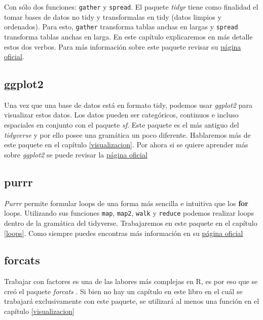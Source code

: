 \documentclass[]{book}
\begin{document}
Con sólo dos funciones: \texttt{gather} y \texttt{spread}. El paquete
\emph{tidyr} \citep{Wickhamtidy} tiene como finalidad el tomar bases de
datos no tidy y transformalas en tidy (datos limpios y ordenados). Para
esto, \texttt{gather} transforma tablas anchas en largas y
\texttt{spread} transforma tablas anchas en larga. En este capítulo
explicaremos en más detalle estos dos verbos. Para más información sobre
este paquete revisar su \href{https://tidyr.tidyverse.org/}{página
oficial}.

\hypertarget{ggplot2}{%
\subsection{ggplot2}\label{ggplot2}}

Una vez que una base de datos está en formato tidy, podemos usar
\emph{ggplot2} \citep{Wickhamggplot} para visualizar estos datos. Los
datos pueden ser categóricos, continuos e incluso espaciales en conjunto
con el paquete \emph{sf}. Este paquete es el más antiguo del
\emph{tidyverse} y por ello posee una gramática un poco diferente.
Hablaremos más de este paquete en el capítulo \ref{visualizacion}. Por
ahora si se quiere aprender más sobre \emph{ggplot2} se puede revisar la
\href{https://ggplot2.tidyverse.org/}{página oficial}

\hypertarget{purrr}{%
\subsection{purrr}\label{purrr}}

\emph{Purrr} \citep{HenryPurrr} permite formular loops de una forma más
sencilla e intuitiva que los \textbf{for} loops. Utilizando sus
funciones \texttt{map}, \texttt{map2}, \texttt{walk} y \texttt{reduce}
podemos realizar loops dentro de la gramática del tidyverse.
Trabajaremos en este paquete en el capítulo \ref{loops}. Como siempre
puedes encontras más información en su
\href{https://purrr.tidyverse.org/}{página oficial}

\hypertarget{forcats}{%
\subsection{forcats}\label{forcats}}

Trabajar con factores es una de las labores más complejas en R, es por
eso que se creó el paquete \emph{forcats} \citep{Wickhamforcats}. Si
bien no hay un capítulo en este libro en el cuál se trabajará
exclusivamente con este paquete, se utilizará al menos una función en el
capítulo \ref{visualizacion}
\end{document}
